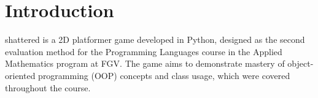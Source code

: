 \section{Introduction}
shattered is a 2D platformer game developed in Python, designed as the second evaluation method for the Programming Languages course in the Applied Mathematics program at FGV. The game aims to demonstrate mastery of object-oriented programming (OOP) concepts and class usage, which were covered throughout the course.
